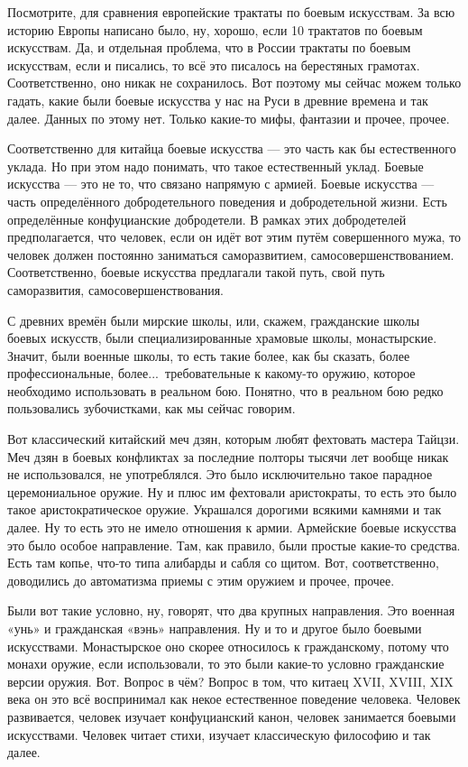 Посмотрите,  для сравнения европейские 
трактаты по боевым искусствам. За всю историю Европы 
написано было,  ну, хорошо, если 10 трактатов по боевым 
искусствам.  Да, и отдельная проблема, что в России 
трактаты по боевым искусствам, если и писались, то всё 
это писалось на берестяных грамотах. Соответственно, 
оно никак не сохранилось. Вот поэтому мы сейчас можем 
только гадать, какие были боевые искусства у нас на 
Руси в древние времена и так далее.  Данных по этому нет. 
Только какие-то мифы, фантазии и прочее, прочее.

Соответственно  для китайца боевые искусства --- это 
часть как бы естественного уклада. Но при этом надо понимать, что
такое естественный уклад. Боевые искусства --- это не 
то, что связано напрямую с армией. Боевые искусства --- 
часть определённого добродетельного поведения и 
добродетельной жизни.  Есть определённые 
конфуцианские добродетели.  В рамках этих 
добродетелей предполагается, что человек, если он 
идёт вот этим путём совершенного мужа,  то человек 
должен постоянно заниматься саморазвитием, 
самосовершенствованием. Соответственно, боевые 
искусства предлагали такой путь,  свой путь 
саморазвития, самосовершенствования.

С древних времён были мирские школы,  или, скажем, гражданские 
школы боевых искусств, были специализированные 
храмовые школы, монастырские.  Значит,  были военные 
школы, то есть такие более, как бы сказать,  более 
профессиональные, более...\ требовательные к какому-то 
оружию, которое необходимо использовать в реальном 
бою.  Понятно, что в реальном бою редко пользовались 
зубочистками, как мы сейчас говорим.

Вот 
классический китайский меч дзян,  которым любят 
фехтовать мастера Тайцзи.  Меч дзян в боевых конфликтах за 
последние полторы тысячи лет вообще никак не 
использовался, не употреблялся. Это было 
исключительно такое парадное церемониальное оружие.  
Ну и плюс им фехтовали аристократы, то есть это было 
такое аристократическое оружие.  Украшался дорогими 
всякими камнями и так далее. Ну то есть это не имело 
отношения к армии.  Армейские боевые искусства это 
было особое направление. Там, как правило, были 
простые какие-то средства. Есть там копье,  что-то типа 
алибарды и сабля со щитом.
Вот, соответственно, 
доводились до автоматизма приемы с этим оружием и 
прочее, прочее.

Были вот такие условно, ну, говорят, что 
два крупных направления. Это военная «унь» и гражданская 
«вэнь» направления. Ну и то и другое было боевыми 
искусствами. Монастырское оно скорее относилось к 
гражданскому, потому что монахи оружие, если 
использовали, то это были какие-то условно 
гражданские версии оружия. Вот. Вопрос в чём? Вопрос в 
том,  что китаец XVII, XVIII, XIX века он это всё воспринимал
как некое естественное поведение человека. Человек развивается, человек изучает 
конфуцианский канон,  человек занимается боевыми 
искусствами. Человек читает стихи, изучает 
классическую философию и так далее.

